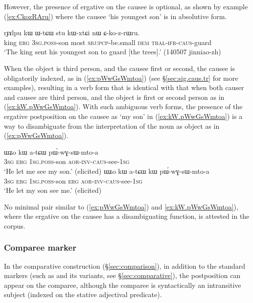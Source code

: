 However, the presence of ergative on the causee is optional, as shown by example (\ref{ex:CkozRAru}) where the causee  `his youngest son' is in absolutive form.

\begin{exe}
\ex \label{ex:CkozRAru}
 \gll rɟɤlpu kɯ ɯ-tɕɯ stu kɯ-xtɕi nɯ ɕ-ko-z-rɯru. \\
 king \textsc{erg} \textsc{3sg}.\textsc{poss}-son most \textsc{sbj}:\textsc{pcp}-be.small \textsc{dem} \textsc{tral}-\textsc{ifr}-\textsc{caus}-guard \\
 \glt  `The king sent his youngest son to guard [the trees].' (140507 jinniao-zh)
\end{exe}

When the object is third person, and the causee first or second, the causee is obligatorily indexed, as in (\ref{ex:pWwGsWmtoa}) (see §\ref{sec:sig.caus.tr} for more examples), resulting in a verb form that is identical with that when both causer and causee are third person, and the object is first or second person as in (\ref{ex:kW.pWwGsWmtoa}). With such ambiguous verb forms, the presence of the ergative postposition on the causee as  `my son' in (\ref{ex:kW.pWwGsWmtoa}) is a way to disambiguate from the interpretation of the noun as object as in (\ref{ex:pWwGsWmtoa}). 

\begin{exe}
\ex
\begin{xlist}
\ex \label{ex:pWwGsWmtoa}
 \gll ɯʑo kɯ a-tɕɯ pɯ́-wɣ-sɯ-mto-a \\
\textsc{3sg} \textsc{erg} \textsc{1sg}.\textsc{poss}-son  \textsc{aor}-\textsc{inv}-\textsc{caus}-see-\textsc{1sg} \\
\glt `He let me see my son.' (elicited)
\ex \label{ex:kW.pWwGsWmtoa}
 \gll ɯʑo kɯ a-tɕɯ kɯ pɯ́-wɣ-sɯ-mto-a \\
\textsc{3sg} \textsc{erg} \textsc{1sg}.\textsc{poss}-son \textsc{erg} \textsc{aor}-\textsc{inv}-\textsc{caus}-see-\textsc{1sg} \\
\glt `He let my son see me.' (elicited)
\end{xlist}
\end{exe}

No minimal pair similar to (\ref{ex:pWwGsWmtoa}) and \ref{ex:kW.pWwGsWmtoa}), where the ergative on the causee has a disambiguating function, is attested in the corpus.


\subsubsection{Comparee marker} \label{sec:comparee.kW}
  
In the comparative construction (§\ref{sec:comparison}), in addition to the standard markers (such as  and its variants, see §\ref{sec:comparative}), the postposition  can appear on the comparee, although the comparee is syntactically an intransitive subject  (indexed on the stative adjectival predicate). 


